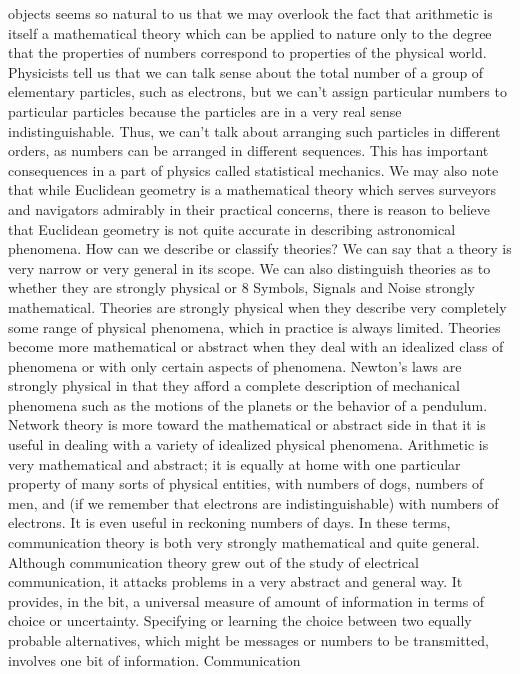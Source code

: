 objects seems so natural to us that we may overlook the fact that
arithmetic is itself a mathematical theory which can be applied to
nature only to the degree that the properties of numbers correspond
to properties of the physical world.
Physicists tell us that we can talk sense about the total number
of a group of elementary particles, such as electrons, but we can’t
assign particular numbers to particular particles because the particles
are in a very real sense indistinguishable. Thus, we can’t talk
about arranging such particles in different orders, as numbers can
be arranged in different sequences. This has important consequences
in a part of physics called statistical mechanics. We may
also note that while Euclidean geometry is a mathematical theory
which serves surveyors and navigators admirably in their practical
concerns, there is reason to believe that Euclidean geometry is not
quite accurate in describing astronomical phenomena.
How can we describe or classify theories? We can say that a
theory is very narrow or very general in its scope. We can also
distinguish theories as to whether they are strongly physical or
8
Symbols, Signals and Noise
strongly mathematical. Theories are strongly physical when they
describe very completely some range of physical phenomena,
which in practice is always limited. Theories become more mathematical
or abstract when they deal with an idealized class of
phenomena or with only certain aspects of phenomena. Newton’s
laws are strongly physical in that they afford a complete description
of mechanical phenomena such as the motions of the planets or
the behavior of a pendulum. Network theory is more toward the
mathematical or abstract side in that it is useful in dealing with a
variety of idealized physical phenomena. Arithmetic is very mathematical
and abstract; it is equally at home with one particular
property of many sorts of physical entities, with numbers of dogs,
numbers of men, and (if we remember that electrons are indistinguishable)
with numbers of electrons. It is even useful in reckoning
numbers of days.
In these terms, communication theory is both very strongly
mathematical and quite general. Although communication theory
grew out of the study of electrical communication, it attacks problems
in a very abstract and general way. It provides, in the bit, a
universal measure of amount of information in terms of choice or
uncertainty. Specifying or learning the choice between two equally
probable alternatives, which might be messages or numbers to be
transmitted, involves one bit of information. Communication
